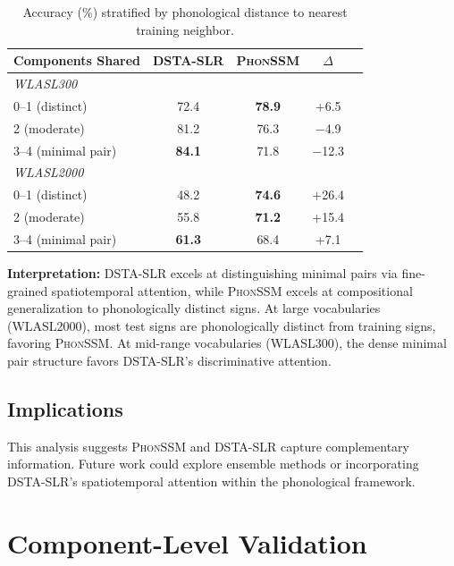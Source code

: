 \documentclass{article}
\theoremstyle{definition}
\theoremstyle{remark}
\newcommand{\phonssm}{\textsc{PhonSSM}}
\begin{document}
\begin{table}[ht]
\caption{Accuracy (\%) stratified by phonological distance to nearest training neighbor.}
\label{tab:method_by_distance}
\vspace{-1mm}
\begin{center}
\begin{small}
\begin{tabular*}{\columnwidth}{@{\extracolsep{\fill}}lcccc@{}}
\toprule
Components Shared & DSTA-SLR & \phonssm{} & $\Delta$ \\
\midrule
\multicolumn{4}{l}{\textit{WLASL300}} \\
0--1 (distinct) & 72.4 & \textbf{78.9} & +6.5 \\
2 (moderate) & 81.2 & 76.3 & $-$4.9 \\
3--4 (minimal pair) & \textbf{84.1} & 71.8 & $-$12.3 \\
\midrule
\multicolumn{4}{l}{\textit{WLASL2000}} \\
0--1 (distinct) & 48.2 & \textbf{74.6} & +26.4 \\
2 (moderate) & 55.8 & \textbf{71.2} & +15.4 \\
3--4 (minimal pair) & \textbf{61.3} & 68.4 & +7.1 \\
\bottomrule
\end{tabular*}
\end{small}
\end{center}
\vspace{-2mm}
\end{table}

\textbf{Interpretation:} DSTA-SLR excels at distinguishing minimal pairs via fine-grained spatiotemporal attention, while \phonssm{} excels at compositional generalization to phonologically distinct signs. At large vocabularies (WLASL2000), most test signs are phonologically distinct from training signs, favoring \phonssm{}. At mid-range vocabularies (WLASL300), the dense minimal pair structure favors DSTA-SLR's discriminative attention.

\subsection{Implications}

This analysis suggests \phonssm{} and DSTA-SLR capture complementary information. Future work could explore ensemble methods or incorporating DSTA-SLR's spatiotemporal attention within the phonological framework.

\section{Component-Level Validation}
\label{app:component_validation}
\end{document}
